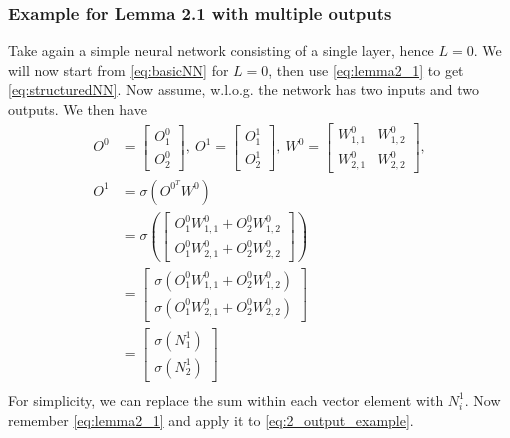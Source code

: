 \documentclass[a4paper]{article}
\begin{document}
\subsubsection{Example for Lemma 2.1 with multiple outputs}
	Take again a simple neural network consisting of a single layer, hence $L=0$. We will now start from \eqref{eq:basicNN} for $L=0$, then use \eqref{eq:lemma2_1} to get \eqref{eq:structuredNN}.
	Now assume, w.l.o.g. the network has two inputs and two outputs. We then have
	\begin{align}
	O^0 &= 	\begin{bmatrix}
				O^0_1 \\ 
				O^0_2
			\end{bmatrix}, ~
	O^1 = 	\begin{bmatrix}
				O^1_1 \\ 
				O^1_2
			\end{bmatrix}, ~
	W^0 = 	\begin{bmatrix}
				W^0_{1,1}  & W^0_{1,2} \\ 
				W^0_{2,1}  & W^0_{2,2}
			\end{bmatrix},	\\
	\label{eq:2_output_example}
	O^1 &=
			\sigma(O^{0^T} W^0) \\
		&=
			\sigma(
			\begin{bmatrix}
				O^0_1 W^0_{1,1}  + O^0_2 W^0_{1,2} \\
				O^0_1 W^0_{2,1}  + O^0_2 W^0_{2,2}
			\end{bmatrix})  \\
		&= 
			\begin{bmatrix}
				\sigma(O^0_1 W^0_{1,1}  + O^0_2 W^0_{1,2}) \\
				\sigma(O^0_1 W^0_{2,1}  + O^0_2 W^0_{2,2})
			\end{bmatrix} \\
		&= 
			\begin{bmatrix}
				\sigma(N^1_1) \\
				\sigma(N^1_2)
			\end{bmatrix} \\
	\end{align}
	For simplicity, we can replace the sum within each vector element with $N^1_i$. Now remember \eqref{eq:lemma2_1} and apply it to \eqref{eq:2_output_example}.
\end{document}
